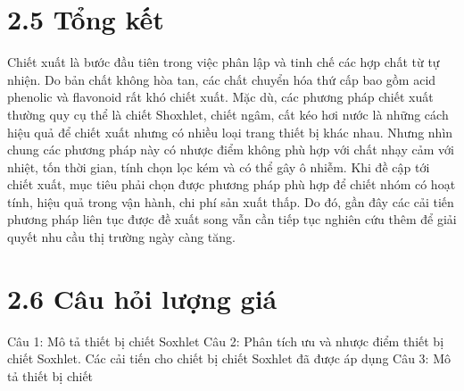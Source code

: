 \documentclass[
  twocolumn,
  landscape]{report}
\begin{document}
\section{2.5 Tổng kết}\label{tux1ed5ng-kux1ebft}

Chiết xuất là bước đầu tiên trong việc phân lập và tinh chế các hợp chất
từ tự nhiện. Do bản chất không hòa tan, các chất chuyển hóa thứ cấp bao
gồm acid phenolic và flavonoid rất khó chiết xuất. Mặc dù, các phương
pháp chiết xuất thường quy cụ thể là chiết Shoxhlet, chiết ngâm, cất kéo
hơi nước là những cách hiệu quả để chiết xuất nhưng có nhiều loại trang
thiết bị khác nhau. Nhưng nhìn chung các phương pháp này có nhược điểm
không phù hợp với chất nhạy cảm với nhiệt, tốn thời gian, tính chọn lọc
kém và có thể gây ô nhiễm. Khi đề cập tới chiết xuất, mục tiêu phải chọn
được phương pháp phù hợp để chiết nhóm có hoạt tính, hiệu quả trong vận
hành, chi phí sản xuất thấp. Do đó, gần đây các cải tiến phương pháp
liên tục được đề xuất song vẫn cần tiếp tục nghiên cứu thêm để giải
quyết nhu cầu thị trường ngày càng tăng.

\section{2.6 Câu hỏi lượng
giá}\label{cuxe2u-hux1ecfi-lux1b0ux1ee3ng-giuxe1}

Câu 1: Mô tả thiết bị chiết Soxhlet Câu 2: Phân tích ưu và nhược điểm
thiết bị chiết Soxhlet. Các cải tiến cho chiết bị chiết Soxhlet đã được
áp dụng Câu 3: Mô tả thiết bị chiết
\end{document}
